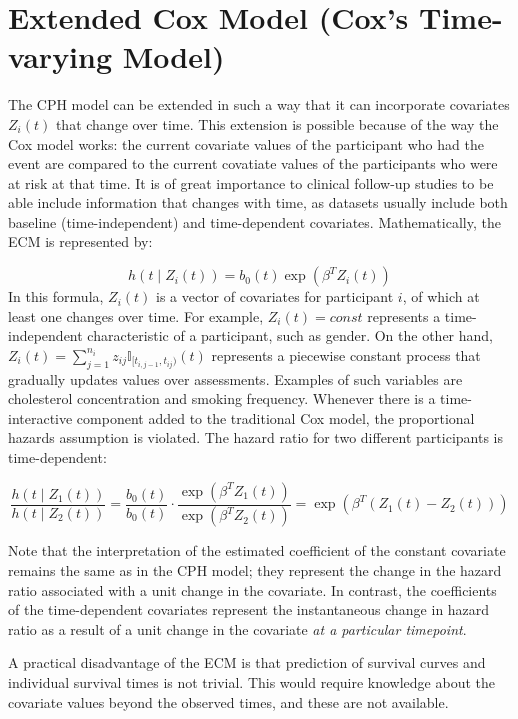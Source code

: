 \section{Extended Cox Model (Cox's Time-varying Model)}
\label{section:methodology:ecm}
The CPH model can be extended in such a way that it can incorporate covariates $Z_i(t)$ that change over time. This extension is possible because of the way the Cox model works: the current covariate values of the participant who had the event are compared to the current covatiate values of the participants who were at risk at that time. It is of great importance to clinical follow-up studies to be able include information that changes with time, as datasets usually include both baseline (time-independent) and time-dependent covariates. Mathematically, the ECM is represented by:  

$$
h(t \mid Z_i(t)) =  b_0(t) \exp(\beta^T Z_i(t)) 
$$
In this formula, $Z_i(t)$ is a vector of covariates for participant $i$, of which at least one changes over time. For example, $Z_{i}(t) = \textit{const}$ represents a time-independent characteristic of a participant, such as gender. On the other hand, $Z_i(t) = \sum_{j=1}^{n_i} z_{ij} \mathbb{I}_{[t_{i,j-1}, t_{ij})}(t)$ represents a piecewise constant process that gradually updates values over assessments. Examples of such variables are cholesterol concentration and smoking frequency. Whenever there is a time-interactive component added to the traditional Cox model, the proportional hazards assumption is violated. The hazard ratio for two different participants is time-dependent: 

$$\frac{h(t \mid Z_1(t))}{h(t \mid Z_2(t))} = \frac{b_0(t)}{b_0(t)} \cdot \frac{\exp(\beta^T Z_1(t))}{\exp(\beta^T Z_2(t))} = \exp(\beta^T (Z_1(t) - Z_2(t) )) $$ 

Note that the interpretation of the estimated coefficient of the constant covariate remains the same as in the CPH model; they represent the change in the hazard ratio associated with a unit change in the covariate. In contrast, the coefficients of the time-dependent covariates represent the instantaneous change in hazard ratio as a result of a unit change in the covariate \textit{at a particular timepoint}. %

A practical disadvantage of the ECM is that prediction of survival curves and individual survival times is not trivial. This would require knowledge about the covariate values beyond the observed times, and these are not available. 

